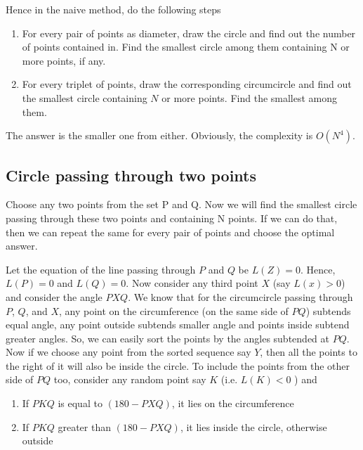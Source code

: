 \documentclass{article}
\begin{document}
        Hence in the naive method, do the following steps
        \begin{enumerate}
            \item For every pair of points as diameter, draw the circle and find out the number of points contained in. Find the smallest circle among them containing N or more points, if any.
            \item For every triplet of points, draw the corresponding circumcircle and find out the smallest circle containing $N$ or more points. Find the smallest among them.
        \end{enumerate}

        The answer is the smaller one from either. Obviously, the complexity is $O(N^4)$.

        \subsection{Circle passing through two points}

        Choose any two points from the set P and Q. Now we will find the smallest circle passing through these two points and containing N points. If we can do that, then we can repeat the same for every pair of points and choose the optimal answer.

        Let the equation of the line passing through $P$ and $Q$ be $L(Z) = 0$. Hence, $L(P) = 0$ and $L(Q) = 0$. Now consider any third point $X$ (say $L(x) > 0$) and consider the angle $PXQ$. We know that for the circumcircle passing through $P$, $Q$, and $X$, any point on the circumference (on the same side of $PQ$) subtends equal angle, any point outside subtends smaller angle and points inside subtend greater angles. So, we can easily sort the points by the angles subtended at $PQ$. Now if we choose any point from the sorted sequence say $Y$, then all the points to the right of it will also be inside the circle. To include the points from the other side of $PQ$ too, consider any random point say $K$ (i.e. $L(K) < 0$ ) and

        \begin{enumerate}
            \item If $PKQ$ is equal to $(180 - PXQ)$, it lies on the circumference
            \item If $PKQ$ greater than $(180 - PXQ)$, it lies inside the circle, otherwise outside
        \end{enumerate}
\end{document}
